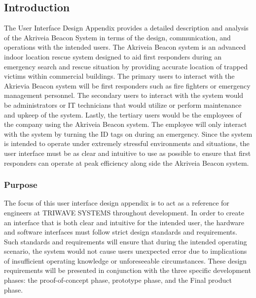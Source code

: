 

\subsection{Introduction}
\medskip
The User Interface Design Appendix provides a detailed description and analysis of the Akriveia Beacon System in terms of the design, communication, and operations with the intended users. The Akriveia Beacon system is an advanced indoor location rescue system designed to aid first responders during an emergency search and rescue situation by providing accurate location of trapped victims within commercial buildings. The primary users to interact with the Akrievia Beacon system will be first responders such as fire fighters or emergency management personnel. The secondary users to interact with the system would be administrators or IT technicians that would utilize or perform maintenance and upkeep of the system. Lastly, the tertiary users would be the employees of the company using the Akriveia Beacon system. The employee will only interact with the system by turning the ID tags on during an emergency. Since the system is intended to operate under extremely stressful environments and situations, the user interface must be as clear and intuitive to use as possible to ensure that first responders can operate at peak efficiency along side the Akriveia Beacon system.
\bigskip

\subsubsection{Purpose}
\medskip
The focus of this user interface design appendix is to act as a reference for engineers at TRIWAVE SYSTEMS throughout development. In order to create an interface that is both clear and intuitive for the intended user, the hardware and software interfaces must follow strict design standards and requirements. Such standards and requirements will ensure that during the intended operating scenario, the system would not cause users unexpected error due to implications of insufficient operating knowledge or unforeseeable circumstances. These design requirements will be presented in conjunction with the three specific development phases: the proof-of-concept phase, prototype phase, and the Final product phase.
\bigskip

